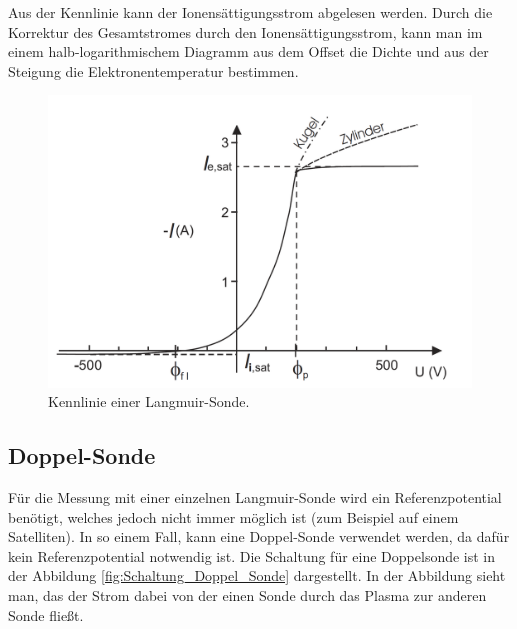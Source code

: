 Aus der Kennlinie kann der Ionensättigungsstrom abgelesen werden. Durch die Korrektur des Gesamtstromes durch den Ionensättigungsstrom, kann man im einem halb-logarithmischem Diagramm aus dem Offset die  Dichte und aus der Steigung die Elektronentemperatur bestimmen. 
\begin{figure}[H]
\centering
\includegraphics[scale=0.4]{Kennlinie_Sonde.PNG}
\caption{Kennlinie einer Langmuir-Sonde. \cite{anleitung}}
\label{fig:Kennlinie_Sonde}
\end{figure}
\subsection{Doppel-Sonde}
Für die Messung mit einer einzelnen Langmuir-Sonde wird ein Referenzpotential benötigt, welches jedoch nicht immer möglich ist (zum Beispiel auf einem Satelliten). In so einem Fall, kann eine Doppel-Sonde \cite{anleitung} verwendet werden, da dafür kein Referenzpotential notwendig ist. Die Schaltung für eine Doppelsonde ist in der Abbildung \ref{fig:Schaltung_Doppel_Sonde} dargestellt. In der Abbildung sieht man, das der Strom dabei von der einen Sonde durch das Plasma zur anderen Sonde fließt. 

